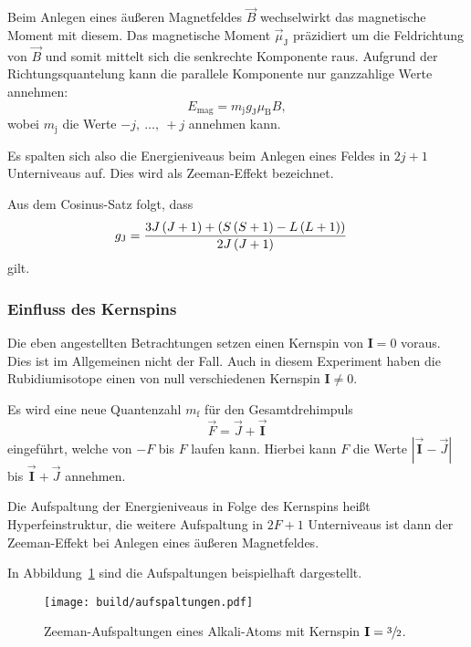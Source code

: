 Beim Anlegen eines äußeren Magnetfeldes $\vec{B}$ wechselwirkt das magnetische Moment mit diesem.
Das magnetische Moment $\vec{\mu}_{\text{J}}$ präzidiert um die Feldrichtung von
$\vec{B}$ und somit mittelt sich die senkrechte Komponente raus.
Aufgrund der Richtungsquantelung kann die parallele Komponente nur ganzzahlige Werte annehmen:
\begin{equation}
  E_\text{mag} = m_\text{j} g_{\text{J}} \mu_\text{B} B,
\end{equation}
wobei $m_\text{j}$ die Werte $-j,~\ldots,~+j$ annehmen kann.

Es spalten sich also die Energieniveaus beim Anlegen eines Feldes in $2j + 1$ Unterniveaus auf.
Dies wird als Zeeman-Effekt bezeichnet.

Aus dem Cosinus-Satz folgt, dass
\begin{align}
  \label{eq:g_j}
  g_\text{J} &= \frac{%
    3 J \left(J + 1\right) + \left(S\left(S + 1\right) - L \left(L + 1\right)\right)
  }{2 J \left(J + 1\right)}
\end{align}
gilt.


\subsubsection{Einfluss des Kernspins}%
\label{sub:einfluss_des_kernspins}

Die eben angestellten Betrachtungen setzen einen Kernspin von $\mathbf{I} = 0$
voraus.
Dies ist im Allgemeinen nicht der Fall.
Auch in diesem Experiment haben die Rubidiumisotope einen von null verschiedenen Kernspin
$\mathbf{I} \neq 0$.

Es wird eine neue Quantenzahl $m_\text{f}$ für den Gesamtdrehimpuls
\begin{equation}
  \vec{F} = \vec{J} + \vec{\mathbf{I}}
\end{equation}
eingeführt, welche von $-F$ bis $F$ laufen kann.
Hierbei kann $F$ die Werte
$\left|\vec{\mathbf{I}} - \vec{J}\right|$ bis $\vec{\mathbf{I}} + \vec{J}$
annehmen.

Die Aufspaltung der Energieniveaus in Folge des Kernspins heißt
Hyperfeinstruktur, die weitere Aufspaltung in $2F + 1$ Unterniveaus ist dann
der Zeeman-Effekt bei Anlegen eines äußeren Magnetfeldes.

In Abbildung~\ref{fig:aufspaltungen} sind die Aufspaltungen beispielhaft
dargestellt.

\begin{figure}[ht]
  \centering
  \texttt{[image: build/aufspaltungen.pdf]}
  \caption{%
    Zeeman-Aufspaltungen eines Alkali-Atoms mit Kernspin $\mathbf{I}
    = \sfrac{3}{2}$.\cite{anleitung}%
  }%
  \label{fig:aufspaltungen}
\end{figure}

